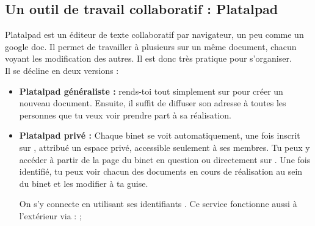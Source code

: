 \subsection{Un outil de travail collaboratif : Platalpad}
\label{platalpad}


Platalpad est un éditeur de texte collaboratif par navigateur, un peu comme un google doc. Il permet de travailler à plusieurs sur un même document, chacun voyant les modification des autres. Il est donc très pratique pour s'organiser.\\
Il se décline en deux versions :
\begin{itemize}

\item \textbf{Platalpad généraliste :} rends-toi tout simplement sur  pour créer un nouveau document. Ensuite, il suffit de diffuser son adresse à toutes les personnes que tu veux voir prendre part à sa réalisation. \\

\item \textbf{Platalpad privé :} Chaque binet se voit automatiquement, une fois inscrit sur \fkz, attribué un espace privé, accessible seulement à ses membres. Tu peux y accéder à partir de la page \fkz du binet en question ou directement sur . Une fois identifié, tu peux voir chacun des documents en cours de réalisation au sein du binet et les modifier à ta guise.

On s'y connecte en utilisant ses identifiants \fkz. Ce service fonctionne aussi à l'extérieur via : 
 ;

\end{itemize}

